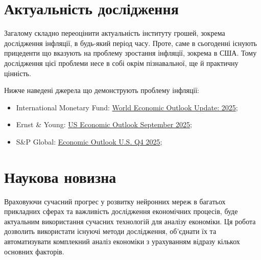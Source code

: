 \documentclass[11pt,a4paper]{article}
\begin{document}
\section*{\textbf{Актуальність дослідження}}

Загалому складно переоцінити актуальність інституту грошей, зокрема дослідження інфляції, в будь-який період часу.
Проте, саме в сьогоденні існують прицеденти що вказують на проблему зростання інфляції, зокрема в США. Тому дослідження
цієї проблеми несе в собі окрім пізнавальної, ще й практичну цінність.

\newpage
\noindent Нижче наведені джерела що демонструють проблему інфляції:
\begin{itemize}
    \item International Monetary Fund: \href{https://www.imf.org/en/Publications/WEO/Issues/2025/07/29/world-economic-outlook-update-july-2025}{World Economic Outlook Update: 2025};
    \item Ernst \& Young: \href{https://www.ey.com/en_us/insights/strategy/macroeconomics/us-economic-outlook}{US Economic Outlook September 2025};
    \item S\&P Global: \href{https://www.spglobal.com/ratings/en/regulatory/article/economic-outlook-us-q4-2025-below-trend-growth-persists-amid-a-swirl-of-policy-shifts-s101646549}{Economic Outlook U.S. Q4 2025};
\end{itemize}


\section*{\textbf{Наукова новизна}}

Враховуючи сучасний прогрес у розвитку нейронних мереж в багатьох прикладних сферах та важливість дослідження економічних процесів,
буде актуальним використання сучасних технологій для аналізу економіки. Ця робота дозволить використати існуючі методи дослідження,
об'єднати їх та автоматизувати комплекний аналіз економіки з урахуванням відразу кількох основних факторів.


\newpage
\end{document}
